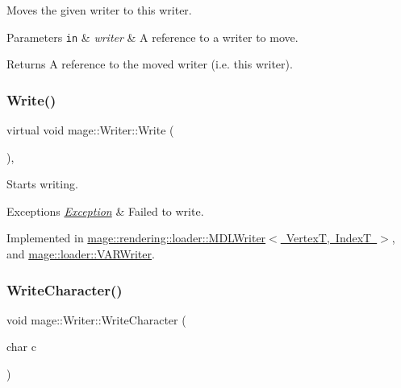Moves the given writer to this writer.


\begin{DoxyParams}[1]{Parameters}
\mbox{\tt in}  & {\em writer} & A reference to a writer to move. \\
\hline
\end{DoxyParams}
\begin{DoxyReturn}{Returns}
A reference to the moved writer (i.\+e. this writer). 
\end{DoxyReturn}
\mbox{\label{classmage_1_1_writer_a9baf695ef7f6180bef883f60bcb3ac07}} 
\subsubsection{\texorpdfstring{Write()}{Write()}}
{\footnotesize\ttfamily virtual void mage\+::\+Writer\+::\+Write (\begin{DoxyParamCaption}{ }\end{DoxyParamCaption})\hspace{0.3cm}{\ttfamily [private]}, {}}

Starts writing.


\begin{DoxyExceptions}{Exceptions}
{\em \mbox{\hyperlink{classmage_1_1_exception}{Exception}}} & Failed to write. \\
\hline
\end{DoxyExceptions}


Implemented in \mbox{\hyperlink{classmage_1_1rendering_1_1loader_1_1_m_d_l_writer_a1506b1a09c7a7c1ee1e206cc6d5cd0e0}{mage\+::rendering\+::loader\+::\+M\+D\+L\+Writer$<$ Vertex\+T, Index\+T $>$}}, and \mbox{\hyperlink{classmage_1_1loader_1_1_v_a_r_writer_af2bbf94353f1b4b01aa56e8dd9c89d7f}{mage\+::loader\+::\+V\+A\+R\+Writer}}.

\mbox{\label{classmage_1_1_writer_aa1ef04f5e69c44afda56704c2823316c}} 
\subsubsection{\texorpdfstring{Write\+Character()}{WriteCharacter()}}
{\footnotesize\ttfamily void mage\+::\+Writer\+::\+Write\+Character (\begin{DoxyParamCaption}\item[{char}]{c }\end{DoxyParamCaption})\hspace{0.3cm}{\ttfamily [protected]}}

